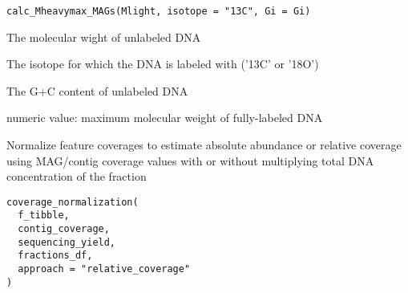 \documentclass[a4paper]{book}
\begin{document}
%
\begin{Usage}
\begin{verbatim}
calc_Mheavymax_MAGs(Mlight, isotope = "13C", Gi = Gi)
\end{verbatim}
\end{Usage}
%
\begin{Arguments}
\begin{ldescription}
\item[\code{Mlight}] The molecular wight of unlabeled DNA

\item[\code{isotope}] The isotope for which the DNA is labeled with ('13C' or '18O')

\item[\code{Gi}] The G+C content of unlabeled DNA
\end{ldescription}
\end{Arguments}
%
\begin{Value}
numeric value: maximum molecular weight of fully-labeled DNA
\end{Value}
%
\begin{Description}\relax
Normalize feature coverages to estimate absolute abundance or relative coverage using MAG/contig coverage values with or without multiplying total DNA concentration of the fraction
\end{Description}
%
\begin{Usage}
\begin{verbatim}
coverage_normalization(
  f_tibble,
  contig_coverage,
  sequencing_yield,
  fractions_df,
  approach = "relative_coverage"
)
\end{verbatim}
\end{Usage}
%
\end{document}
